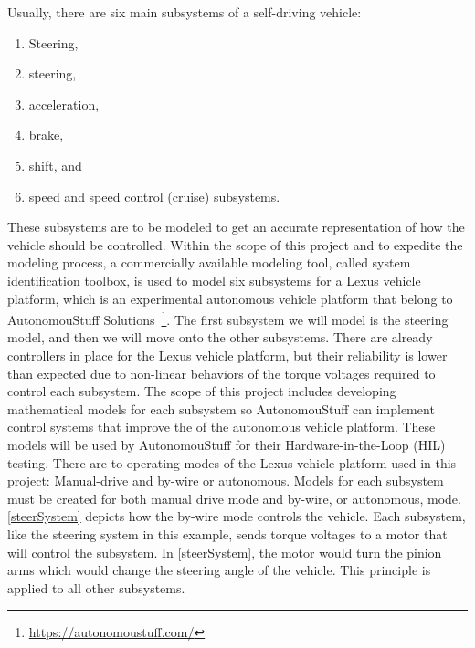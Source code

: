 \documentclass[letterpaper,12pt]{article}   %
\begin{document}
\vspace*{12pt}

\noindent Usually, there are six main subsystems of a self-driving vehicle: %
%
\begin{enumerate}
\item  Steering,
  
\item steering,
  
\item acceleration,
  
\item brake,
  
\item shift, and 
  
\item speed and speed control
  (cruise) subsystems.
\end{enumerate}
%
These subsystems are to be modeled to get an accurate representation of how
the vehicle should be controlled. Within the scope of this project and to expedite the modeling process, a commercially available modeling tool, called system identification toolbox, is used to model six subsystems for a Lexus vehicle platform, which is an experimental autonomous vehicle platform that belong to AutonomouStuff Solutions~\footnote{\url{https://autonomoustuff.com/}}. The first subsystem we will model is the steering model, and then we will move onto
the other subsystems. There are already controllers in place for the Lexus
vehicle platform, but their reliability is lower than expected due to non-linear
behaviors of the torque voltages required to control each subsystem. The scope
of this project includes developing mathematical models for each subsystem so
AutonomouStuff can implement control systems that improve the  of the
autonomous vehicle platform. These models will be used by AutonomouStuff for
their Hardware-in-the-Loop (HIL) testing.  There are to operating modes of the Lexus vehicle platform used in this project: Manual-drive and by-wire or autonomous. Models for each subsystem must be created
for both manual drive mode and by-wire, or autonomous, mode.
\autoref{steerSystem} depicts how the by-wire mode controls the vehicle. Each
subsystem, like the steering system in this example, sends torque voltages to a
motor that will control the subsystem. In \autoref{steerSystem}, the motor would
turn the pinion arms which would change the steering angle of the vehicle. This
principle is applied to all other subsystems.
\end{document}
